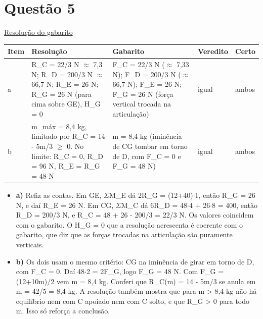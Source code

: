 \documentclass{article}%
\begin{document}
\section*{Questão 5}%
\href{https://poliedroresolve.sistemapoliedro.com.br/vestibulares/ime/2026/ime-2-fase-dia-2-24-10-2025-2-fase-dia-2/dissertativa-5-fisica-2-fase-dia-2-ime-2026}{Resolução do gabarito}\par\smallskip%
\begin{longtable}{@{}p{} p{} p{} p{} p{}@{}}\toprule Item & Resolução & Gabarito & Veredito & Certo \\ \midrule
a & R\_C = 22/3 N $\approx$ 7,3 N; R\_D = 200/3 N $\approx$ 66,7 N; R\_E = 26 N; R\_G = 26 N (para cima sobre GE), H\_G = 0 & F\_C = 22/3 N ($\approx$ 7,33 N); F\_D = 200/3 N ($\approx$ 66,7 N); F\_E = 26 N; F\_G = 26 N (força vertical trocada na articulação) & igual & ambos \\
b & m\_máx = 8,4 kg, limitado por R\_C = 14 - 5m/3 $\geq$ 0. No limite: R\_C = 0, R\_D = 96 N, R\_E = R\_G = 48 N & m = 8,4 kg (iminência de CG tombar em torno de D, com F\_C = 0 e F\_G = 48 N) & igual & ambos \\
\bottomrule\end{longtable}%
\begin{itemize}%
\item%
\textbf{a)} Refiz as contas. Em GE, $\Sigma$M\_E dá 2R\_G = (12+40)$\cdot$1, então R\_G = 26 N, e daí R\_E = 26 N. Em CG, $\Sigma$M\_C dá 6R\_D = 48$\cdot$4 + 26$\cdot$8 = 400, então R\_D = 200/3 N, e R\_C = 48 + 26 - 200/3 = 22/3 N. Os valores coincidem com o gabarito. O H\_G = 0 que a resolução acrescenta é coerente com o gabarito, que diz que as forças trocadas na articulação são puramente verticais.%
\item%
\textbf{b)} Os dois usam o mesmo critério: CG na iminência de girar em torno de D, com F\_C = 0. Daí 48$\cdot$2 = 2F\_G, logo F\_G = 48 N. Com F\_G = (12+10m)/2 vem m = 8,4 kg. Conferi que R\_C(m) = 14 - 5m/3 se anula em m = 42/5 = 8,4 kg. A resolução também mostra que para m > 8,4 kg não há equilíbrio nem com C apoiado nem com C solto, e que R\_G > 0 para todo m. Isso só reforça a conclusão.%
\end{itemize}%
\end{document}
